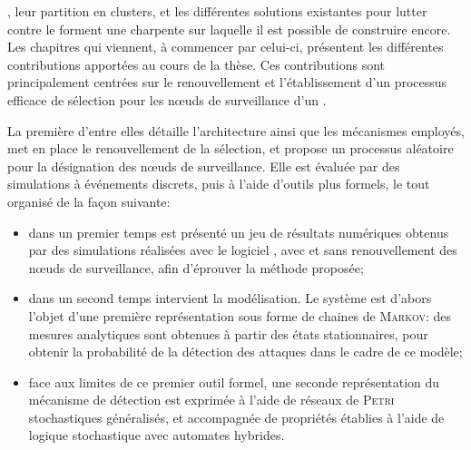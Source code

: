 
, leur partition en clusters, et les différentes solutions existantes pour lutter contre le \dds forment une charpente sur laquelle il est possible de construire encore.
Les chapitres qui viennent, à commencer par celui-ci, présentent les différentes contributions apportées au cours de la thèse.
Ces contributions sont principalement centrées sur le renouvellement et l'établissement d'un processus efficace de sélection pour les nœuds de surveillance d'un \rcs.

La première d'entre elles détaille l'architecture ainsi que les mécanismes employés, met en place le renouvellement de la sélection, et propose un processus aléatoire pour la désignation des nœuds de surveillance.
Elle est évaluée par des simulations à événements discrets, puis à l'aide d'outils plus formels, le tout organisé de la façon suivante:
\begin{itemize}
    \item dans un premier temps est présenté un jeu de résultats numériques obtenus par des simulations réalisées avec le logiciel \nsii, avec et sans renouvellement des nœuds de surveillance, afin d'éprouver la méthode proposée;
    \item dans un second temps intervient la modélisation. Le système est d'abors l'objet d'une première représentation sous forme de chaines de \textsc{Markov}: des mesures analytiques sont obtenues à partir des états stationnaires, pour obtenir la probabilité de la détection des attaques dans le cadre de ce modèle;
    \item face aux limites de ce premier outil formel, une seconde représentation du mécanisme de détection est exprimée à l'aide de réseaux de \textsc{Petri} stochastiques généralisés, et accompagnée de propriétés établies à l'aide de logique stochastique avec automates hybrides.
\end{itemize}
